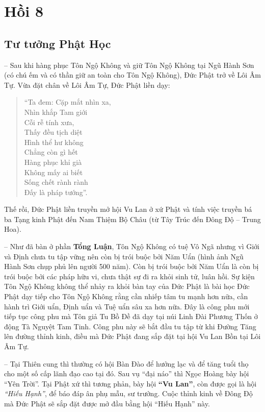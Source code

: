 \chapter{Hồi 8} %
\label{cha:hoi_8}

\section{Tư tưởng Phật Học} %
\label{sec:8_phat_hoc}

-- Sau khi hàng phục Tôn Ngộ Không và giữ Tôn Ngộ Không tại Ngũ Hành Sơn (có chú ếm và có thần giữ an toàn cho Tôn Ngộ Không), Đức Phật trở về Lôi Âm Tự. Vừa đặt chân về Lôi Âm Tự, Đức Phật liền dạy:

\begin{verse}
\begin{itshape}
``Ta đem: Cặp mắt nhìn xa,\\
Nhìn khắp Tam giới\\
Cỗi rễ tính xưa,\\
Thấy đều tịch diệt\\
Hình thể hư không\\
Chẳng còn gì hết\\
Hàng phục khỉ già\\
Không mấy ai biết\\
Sống chết rành rành\\
Đấy là pháp tướng''.
\end{itshape}
\end{verse}

Thế rồi, Đức Phật liền truyền mở hội Vu Lan ở xứ Phật và tính việc truyền bá ba Tạng kinh Phật đến Nam Thiệm Bộ Châu (từ Tây Trúc đến Đông Độ -- Trung Hoa).

-- Như đã bàn ở phần {\bf Tổng Luận}, Tôn Ngộ Không có tuệ Vô Ngã nhưng vì Giới và Định chưa tu tập vững nên còn bị trói buộc bởi Năm Uẩn (hình ảnh Ngũ Hành Sơn chụp phủ lên người 500 năm). Còn bị trói buộc bởi Năm Uẩn là còn bị trói buộc bởi các pháp hữu vi, chưa thật sự đi ra khỏi sinh tử, luân hồi. Sự kiện Tôn Ngộ Không không thể nhảy ra khỏi bàn tay của Đức Phật là bài học Đức Phật dạy tiếp cho Tôn Ngộ Không rằng cần nhiếp tâm tu mạnh hơn nữa, cần hành trì Giới uẩn, Định uẩn và Tuệ uẩn sâu xa hơn nữa. Đây là công phu mới tiếp tục công phu mà Tôn giả Tu Bồ Đề đã dạy tại núi Linh Đài Phương Thốn ở động Tà Nguyệt Tam Tinh. Công phu này sẽ bắt đầu tu tập từ khi Đường Tăng lên đường thỉnh kinh, điều mà Đức Phật đang sắp đặt tại hội Vu Lan Bồn tại Lôi Âm Tự.

-- Tại Thiên cung thì thường có hội Bàn Đào để hưởng lạc và để tăng tuổi thọ cho một số cấp lãnh đạo cao tại đó. Sau vụ ``đại náo'' thì Ngọc Hoàng bày hội ``Yên Trời''. Tại Phật xứ thì tương phản, bày hội \textbf{``Vu Lan''}, còn được gọi là hội \emph{``Hiếu Hạnh''}, để báo đáp ân phụ mẫu, sư trưởng. Cuộc thỉnh kinh về Đông Độ mà Đức Phật sẽ sắp đặt được mở đầu bằng hội ``Hiếu Hạnh'' này.


